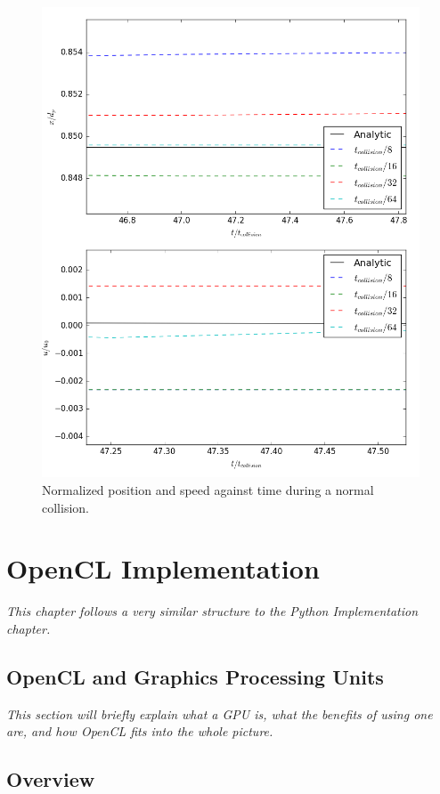 \documentclass[10pt,a4paper,titlepage]{report}
\begin{document}
\begin{figure}[!htb]
\includegraphics[scale=0.4]{figures/python_verification/friction_verification_zoomed.png}
\caption{Normalized position and speed against time during a normal collision.}
\label{fig:python_friction_verification}
\end{figure}
\chapter{OpenCL Implementation}
\label{ch:OpenCL Implementation}
\textit{This chapter follows a very similar structure to the Python Implementation chapter.}
\section{OpenCL and Graphics Processing Units}
\textit{This section will briefly explain what a GPU is, what the benefits of using one are, and how OpenCL fits into the whole picture.}
\section{Overview}
\end{document}
